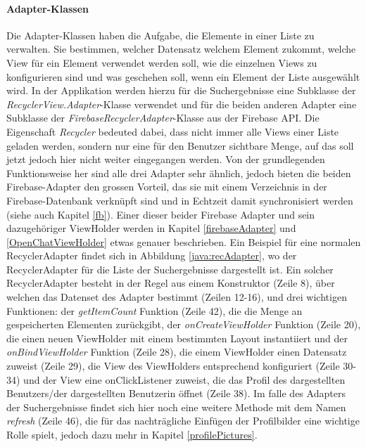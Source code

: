 \documentclass[a4paper,11pt]{report}
\begin{document}
				\paragraph{Adapter-Klassen}
				Die Adapter-Klassen haben die Aufgabe, die Elemente in einer Liste zu verwalten. Sie bestimmen, welcher Datensatz welchem Element zukommt, welche View für ein Element verwendet werden soll, wie die einzelnen Views zu konfigurieren sind und was geschehen soll, wenn ein Element der Liste ausgewählt wird. In der Applikation werden hierzu für die Suchergebnisse eine Subklasse der \emph{RecyclerView.Adapter}-Klasse verwendet und für die beiden anderen Adapter eine Subklasse der \emph{FirebaseRecyclerAdapter}-Klasse aus der Firebase API. Die Eigenschaft \emph{Recycler} bedeuted dabei, dass nicht immer alle Views einer Liste geladen werden, sondern nur eine für den Benutzer sichtbare Menge, auf das soll jetzt jedoch hier nicht weiter eingegangen werden. Von der grundlegenden Funktionsweise her sind alle drei Adapter sehr ähnlich, jedoch bieten die beiden Firebase-Adapter den grossen Vorteil, das sie mit einem Verzeichnis in der Firebase-Datenbank verknüpft sind und in Echtzeit damit synchronisiert werden (siehe auch Kapitel \ref{fb}). Einer dieser beider Firebase Adapter und sein dazugehöriger ViewHolder werden in Kapitel \ref{firebaseAdapter} und \ref{OpenChatViewHolder} etwas genauer beschrieben. Ein Beispiel für eine normalen RecyclerAdapter findet sich in Abbildung \ref{java:recAdapter}, wo der RecyclerAdapter für die Liste der Suchergebnisse dargestellt ist. Ein solcher RecyclerAdapter besteht in der Regel aus einem Konstruktor (Zeile 8), über welchen das Datenset des Adapter bestimmt (Zeilen 12-16), und drei wichtigen Funktionen: der \emph{getItemCount} Funktion (Zeile 42), die die Menge an gespeicherten Elementen zurückgibt, der \emph{onCreateViewHolder} Funktion (Zeile 20), die einen neuen ViewHolder mit einem bestimmten Layout instantiiert und der \emph{onBindViewHolder} Funktion (Zeile 28), die einem ViewHolder einen Datensatz zuweist (Zeile 29), die View des ViewHolders entsprechend konfiguriert (Zeile 30-34) und der View eine onClickListener zuweist, die das Profil des dargestellten Benutzers/der dargestellten Benutzerin öffnet (Zeile 38). Im falle des Adapters der Suchergebnisse findet sich hier noch eine weitere Methode mit dem Namen \emph{refresh} (Zeile 46), die für das nachträgliche Einfügen der Profilbilder eine wichtige Rolle spielt, jedoch dazu mehr in Kapitel \ref{profilePictures}.
				
\end{document}
